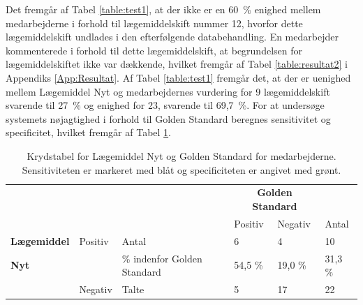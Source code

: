 Det fremgår af Tabel \ref{table:test1}, at der ikke er en 60~\% enighed mellem medarbejderne i forhold til lægemiddelskift nummer 12, hvorfor dette lægemiddelskift undlades i den efterfølgende databehandling. En medarbejder kommenterede i forhold til dette lægemiddelskift, at begrundelsen for lægemiddelskiftet ikke var dækkende, hvilket fremgår af Tabel \ref{table:resultat2} i Appendiks \ref{App:Resultat}. Af Tabel \ref{table:test1} fremgår det, at der er uenighed mellem Lægemiddel Nyt og medarbejdernes vurdering for 9 lægemiddelskift svarende til 27~\% og enighed for 23, svarende til 69,7~\%. 
For at undersøge systemets nøjagtighed i forhold til Golden Standard beregnes sensitivitet og specificitet, hvilket fremgår af Tabel \ref{table:PositivNegativ}.

\begin{table}[H]
\caption{Krydstabel for Lægemiddel Nyt og Golden Standard for medarbejderne. Sensitiviteten er markeret med blåt og specificiteten er angivet med grønt.}
\label{table:PositivNegativ}
\centering
\begin{tabular}{ll|l|l|l|l}
 \rowcolor[HTML]{C0C0C0}                          &                          &                            & \multicolumn{2}{c|}{\textbf{Golden Standard}} &        \\ 
  \rowcolor[HTML]{C0C0C0}                                                         &                          &                            & Positiv       & Negativ          & Antal  \\ \hline
\cellcolor[HTML]{C0C0C0} \textbf{Lægemiddel}                                                \hspace{-0.5cm} \multirow{4}{*}{} &  \cellcolor[HTML]{C0C0C0}                                                      Positiv \multirow{2}{*}{} & Antal & 6                & 4                & 10     \\ \cline{3-6} 
\cellcolor[HTML]{C0C0C0}                                                                \textbf{Nyt} &   \cellcolor[HTML]{C0C0C0}                                               & \% indenfor Golden Standard & \cellcolor[HTML]{ECF4FF} 54,5 \%           & 19,0 \%           & 31,3 \% \\\cline{2-6}
\cellcolor[HTML]{C0C0C0}                                                                                 & \cellcolor[HTML]{C0C0C0}                                                                               Negativ \multirow{2}{*}{} & Talte & 5                & 17               & 22     \\ \cline{3-6}

\end{tabular}
\end{table}
